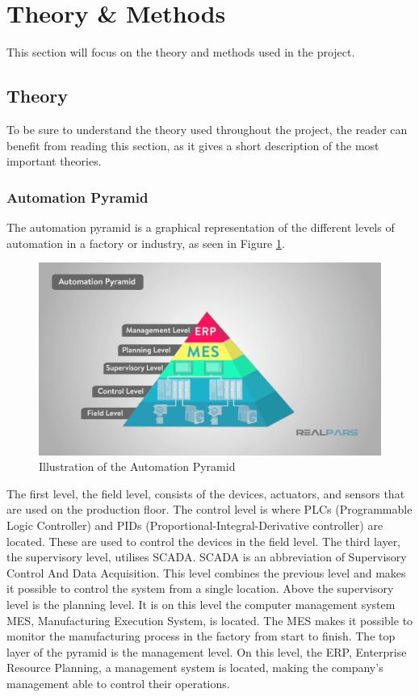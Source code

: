 \section{Theory \& Methods}
This section will focus on the theory and methods used in the project.

\subsection{Theory}
To be sure to understand the theory used throughout the project, the reader can
benefit from reading this section, as it gives a short description of the most
important theories.

\subsubsection{Automation Pyramid}
The automation pyramid is a graphical representation of the different levels of
automation in a factory or industry, as seen in Figure \ref{figure:ap}.

\begin{figure}[ht]
	\centering 
	\includegraphics[width=1\linewidth]{images/automation_pyramid}
	\caption{Illustration of the Automation Pyramid}
	\label{figure:ap}
\end{figure}


The first level, the field level, consists of the devices, actuators, and
sensors that are used on the production floor. The control level is where PLCs
(Programmable Logic Controller) and PIDs (Proportional-Integral-Derivative
controller) are located. These are used to control the devices in the field
level. The third layer, the supervisory level, utilises SCADA. SCADA
is an abbreviation of Supervisory Control And Data Acquisition. This level
combines the previous level and makes it possible to control the system from
a single location. Above the supervisory level is the planning level. It is on
this level the computer management system MES, Manufacturing Execution System,
is located. The MES makes it possible to monitor the manufacturing process in
the factory from start to finish. The top layer of the pyramid is the management
level. On this level, the ERP, Enterprise Resource Planning, a management system
is located, making the company's management able to control their operations. \cite{ap}\\

